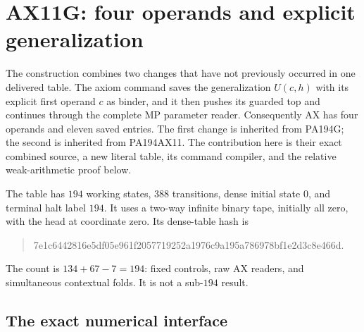 \section{AX11G: four operands and explicit generalization}
\label{sec:ax11g}

The construction combines two changes that have not previously occurred in
one delivered table. The axiom command saves the generalization
$U(c,h)$ with its explicit first operand $c$ as binder, and it then pushes
its guarded top and continues through the complete MP parameter reader.
Consequently AX has four operands and eleven saved entries. The first
change is inherited from PA194G; the second is inherited from PA194AX11.
The contribution here is their exact combined source, a new literal table,
its command compiler, and the relative weak-arithmetic proof below.

The table has $194$ working states, $388$ transitions, dense initial state
$0$, and terminal halt label $194$. It uses a two-way infinite binary tape,
initially all zero, with the head at coordinate zero. Its dense-table hash is
\begin{quote}\small\ttfamily
7e1c6442816e5df05e961f2057719252a1976c9a195a786978bf1e2d3c8e466d.
\end{quote}
The count is $134+67-7=194$: fixed controls, raw AX readers, and simultaneous
contextual folds. It is not a sub-$194$ result.

\subsection{The exact numerical interface}

